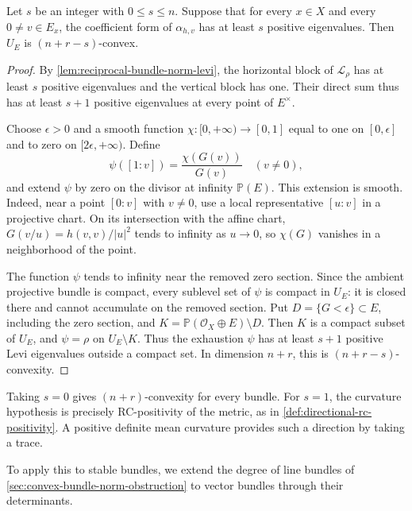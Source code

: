 \begin{theorem}\label{thm:bundle-curvature-complement-convexity}
Let $s$ be an integer with $0\leq s\leq n$. Suppose that for every $x\in X$ and every $0\ne v\in E_x$, the coefficient form of $\alpha_{h,v}$ has at least $s$ positive eigenvalues. Then $U_E$ is $(n+r-s)$-convex.
\end{theorem}
\begin{proof}
By \cref{lem:reciprocal-bundle-norm-levi}, the horizontal block of $\mathcal L_\rho$ has at least $s$ positive eigenvalues and the vertical block has one. Their direct sum thus has at least $s+1$ positive eigenvalues at every point of $E^\times$.

Choose $\epsilon>0$ and a smooth function $\chi\colon[0,+\infty)\to[0,1]$ equal to one on $[0,\epsilon]$ and to zero on $[2\epsilon,+\infty)$. Define
\[
 \psi([1:v])=\frac{\chi(G(v))}{G(v)}\quad(v\ne0),
\]
and extend $\psi$ by zero on the divisor at infinity $\mathbb P(E)$. This extension is smooth. Indeed, near a point $[0:v]$ with $v\ne0$, use a local representative $[u:v]$ in a projective chart. On its intersection with the affine chart, $G(v/u)=h(v,v)/|u|^2$ tends to infinity as $u\to0$, so $\chi(G)$ vanishes in a neighborhood of the point.

The function $\psi$ tends to infinity near the removed zero section. Since the ambient projective bundle is compact, every sublevel set of $\psi$ is compact in $U_E$: it is closed there and cannot accumulate on the removed section. Put $D=\{G<\epsilon\}\subset E$, including the zero section, and $K=\mathbb P(\mathcal O_X\oplus E)\setminus D$. Then $K$ is a compact subset of $U_E$, and $\psi=\rho$ on $U_E\setminus K$. Thus the exhaustion $\psi$ has at least $s+1$ positive Levi eigenvalues outside a compact set. In dimension $n+r$, this is $(n+r-s)$-convexity.
\end{proof}

Taking $s=0$ gives $(n+r)$-convexity for every bundle. For $s=1$, the curvature hypothesis is precisely RC-positivity of the metric, as in \cref{def:directional-rc-positivity}. A positive definite mean curvature provides such a direction by taking a trace.

To apply this to stable bundles, we extend the degree of line bundles of \cref{sec:convex-bundle-norm-obstruction} to vector bundles through their determinants.

